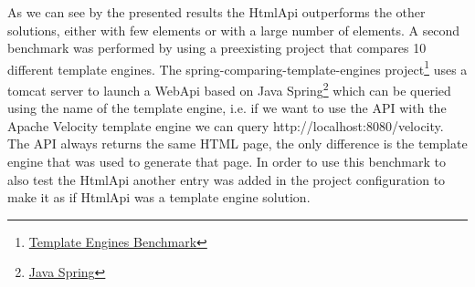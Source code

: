 \begin{center}
\end{center}


\noindent
As we can see by the presented results the HtmlApi outperforms the other solutions, either with few elements or with a large number of elements. A second benchmark was performed by using a preexisting project that compares 10 different template engines. The spring-comparing-template-engines project\footnote{\href{https://github.com/jreijn/spring-comparing-template-engines}{Template Engines Benchmark}} uses a tomcat server to launch a WebApi based on Java Spring\footnote{\href{https://spring.io/}{Java Spring}} which can be queried using the name of the template engine, i.e. if we want to use the \ac{API} with the Apache Velocity template engine we  can query http://localhost:8080/velocity. The \ac{API} always returns the same \ac{HTML} page, the only difference is the template engine that was used to generate that page. In order to use this benchmark to also test the HtmlApi another entry was added in the project configuration to make it as if HtmlApi was a template engine solution. 

